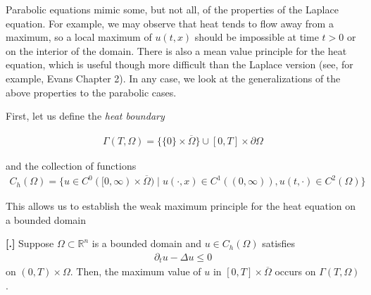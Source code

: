 \documentclass{article}
\newcommand{\R}{{\mathbb{R}}}
\newcommand{\cl}[1]{{\overline{#1}}}
\newcommand{\pd}{\partial}
\newcounter{result}[section]
\newenvironment{res}[1][]{\refstepcounter{result}\par\medskip
	\noindent \textbf{[\thesection.\theresult] #1} \rmfamily}{\medskip}
\begin{document}
	Parabolic equations mimic some, but not all, of the properties of the Laplace equation. For example, we may observe that heat tends to flow away from a maximum, so a local maximum of $u(t,x)$ should be impossible at time $t>0$ or on the interior of the domain. There is also a mean value principle for the heat equation, which is useful though more difficult than the Laplace version (see, for example, Evans Chapter 2). In any case, we look at the generalizations of the above properties to the parabolic cases. 
	
	First, let us define the \textit{heat boundary}
	
	\begin{align*}
		\Gamma(T,\Omega) = \{\{0\} \times \cl{\Omega}\} \cup [0,T] \times \pd \Omega
	\end{align*}
	
	and the collection of functions 
	\begin{align*}
		C_{h}(\Omega) = \{ u \in C^{0}([0,\infty) \times \cl{\Omega}) \mid u(\cdot, x) \in C^{1}((0,\infty)), u(t,\cdot) \in C^{2}(\Omega)\}
	\end{align*}
	
	
	This allows us to establish the weak maximum principle for the heat equation on a bounded domain
	
	\begin{res}
		Suppose $\Omega \subset \R^{n}$ is a bounded domain and $u \in C_{h}(\Omega)$ satisfies 
		\begin{align*}
			\pd_{t} u - \Delta u \leq 0
		\end{align*}
		on $(0,T) \times \Omega$. Then, the maximum value of $u$ in $[0,T] \times \cl{\Omega}$ occurs on $\Gamma(T,\Omega)$. 
	\end{res}
	
\end{document}
